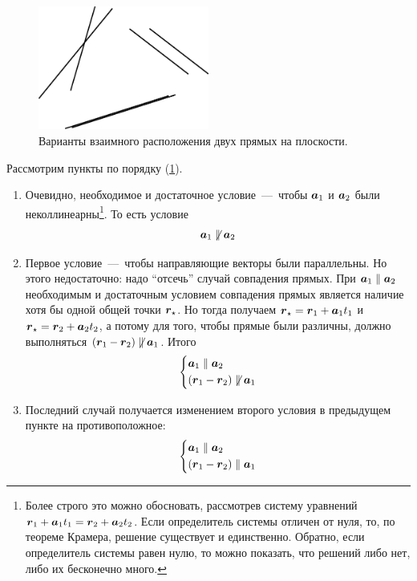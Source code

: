\documentclass[a4paper,12pt]{article}
\begin{document}
  \begin{solution}
    \begin{figure}[h]
      \centering
      
      \includegraphics[width=0.5\textwidth]{lines-on-plane}
      
      \caption{Варианты взаимного расположения двух прямых на плоскости.}
      \label{fig:lines-on-plane}
    \end{figure}
    
    Рассмотрим пункты по порядку (\ref{fig:lines-on-plane}).
    
    \begin{enumerate}
      \item Очевидно, необходимое и достаточное условие~---~чтобы $\boldsymbol a_1$ и $\boldsymbol a_2$ были неколлинеарны\footnote{Более строго это можно обосновать, рассмотрев систему уравнений $\bds r_1 \hm+ \bds a_1 t_1 \hm= \bds r_2 \hm+ \bds a_2 t_2$. Если определитель системы отличен от нуля, то, по теореме Крамера, решение существует и единственно. Обратно, если определитель системы равен нулю, то можно показать, что решений либо нет, либо их бесконечно много.}.
      То есть условие
      \[
        \boldsymbol a_1 \not\parallel \boldsymbol a_2
      \]
      
      \item Первое условие~---~чтобы направляющие векторы были параллельны.
      Но этого недостаточно: надо ``отсечь'' случай совпадения прямых.
      При $\bds a_1 \hm\parallel \bds a_2$ необходимым и достаточным условием совпадения прямых является наличие хотя бы одной общей точки $\boldsymbol r_{\star}$.
      Но тогда получаем $\bds r_{\star} \hm= \bds r_1 \hm+ \bds a_1 t_1$ и $\bds r_{\star} \hm= \bds r_2 \hm+ \bds a_2 t_2$, а потому для того, чтобы прямые были различны, должно выполняться $(\bds r_1 \hm- \bds r_2) \hm{\not\parallel} \bds a_1$.
      Итого
      \[
        \left\{
          \begin{aligned}
            &\bds a_1 \parallel \bds a_2\\
            &(\bds r_1 \hm- \bds r_2) \not\parallel \bds a_1
          \end{aligned}
        \right.
      \]
      
      \item Последний случай получается изменением второго условия в предыдущем пункте на противоположное:
      \[
        \left\{
          \begin{aligned}
            &\bds a_1 \parallel \bds a_2\\
            &(\bds r_1 \hm- \bds r_2) \parallel \bds a_1
          \end{aligned}
        \right.
      \]
    \end{enumerate}
  \end{solution}
  
\end{document}
